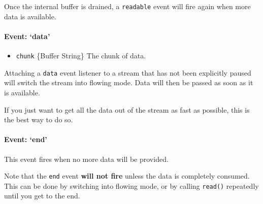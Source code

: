 Once the internal buffer is drained, a \texttt{readable} event will fire
again when more data is available.

\paragraph{Event: `data'}\label{event-data}

\begin{itemize}
\itemsep1pt\parskip0pt
\item
  \texttt{chunk} \{Buffer \textbar{} String\} The chunk of data.
\end{itemize}

Attaching a \texttt{data} event listener to a stream that has not been
explicitly paused will switch the stream into flowing mode. Data will
then be passed as soon as it is available.

If you just want to get all the data out of the stream as fast as
possible, this is the best way to do so.

\begin{Shaded}
\end{Shaded}

\paragraph{Event: `end'}\label{event-end}

This event fires when no more data will be provided.

Note that the \texttt{end} event \textbf{will not fire} unless the data
is completely consumed. This can be done by switching into flowing mode,
or by calling \texttt{read()} repeatedly until you get to the end.

\begin{Shaded}
\end{Shaded}

